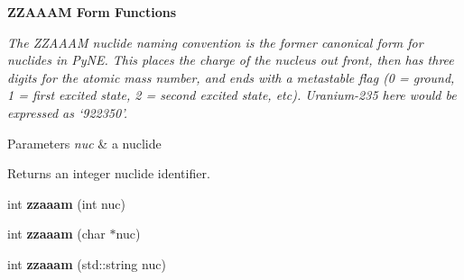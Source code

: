 \begin{Indent}{\bf Z\+Z\+A\+A\+A\+M Form Functions}\par
{\em The Z\+Z\+A\+A\+A\+M nuclide naming convention is the former canonical form for nuclides in Py\+N\+E. This places the charge of the nucleus out front, then has three digits for the atomic mass number, and ends with a metastable flag (0 = ground, 1 = first excited state, 2 = second excited state, etc). Uranium-\/235 here would be expressed as ‘922350’. 
\begin{DoxyParams}{Parameters}
{\em nuc} & a nuclide \\
\hline
\end{DoxyParams}
\begin{DoxyReturn}{Returns}
an integer nuclide identifier. 
\end{DoxyReturn}
}\begin{DoxyCompactItemize}
\item 
\hypertarget{namespacepyne_1_1nucname_ac28bf4202f94c1902bdcb2f0caf314e3}{int {\bfseries zzaaam} (int nuc)}\label{namespacepyne_1_1nucname_ac28bf4202f94c1902bdcb2f0caf314e3}

\item 
\hypertarget{namespacepyne_1_1nucname_ae8f1eddf40a92a093103aa2b4adee432}{int {\bfseries zzaaam} (char $\ast$nuc)}\label{namespacepyne_1_1nucname_ae8f1eddf40a92a093103aa2b4adee432}

\item 
\hypertarget{namespacepyne_1_1nucname_aff543a0a9df5e199902780b49d4e82f6}{int {\bfseries zzaaam} (std\+::string nuc)}\label{namespacepyne_1_1nucname_aff543a0a9df5e199902780b49d4e82f6}

\end{DoxyCompactItemize}
\end{Indent}

